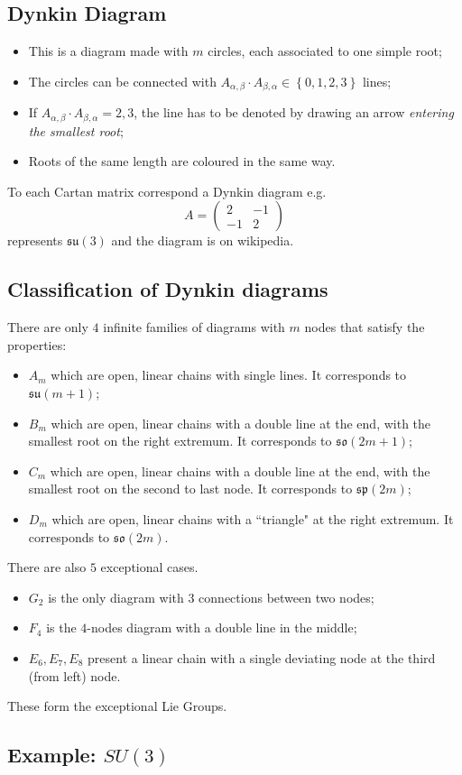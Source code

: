 \subsection{Dynkin Diagram}
\begin{itemize}
    \item This is a diagram made with $m$ circles, each associated to one simple
        root;
    \item The circles can be connected with $A_{\alpha,\beta}\cdot
        A_{\beta,\alpha}\in\left\{0,1,2,3\right\}$ lines;
    \item If $A_{\alpha,\beta}\cdot A_{\beta,\alpha}=2,3$, the line
        has to be denoted by drawing an arrow \textit{entering the smallest root};
    \item Roots of the same length are coloured in the same way.
\end{itemize}
To each Cartan matrix correspond a Dynkin diagram e.g.
\[
    A=\begin{pmatrix}
        2&-1\\
        -1&2
    \end{pmatrix} 
\]
represents $\mathfrak{su}(3)$ and the diagram is on wikipedia.
\subsection{Classification of Dynkin diagrams}
There are only $4$ infinite families of diagrams with $m$ nodes that satisfy the
properties:
\begin{itemize}
    \item $A_m$ which are open, linear chains with single lines.
        It corresponds to $\mathfrak{su}(m+1)$;
    \item $B_m$ which are open, linear chains with a double line at
        the end, with the smallest root on the right extremum. It corresponds to
        $\mathfrak{so}(2m+1)$;
    \item $C_m$ which are open, linear chains with a double line at
        the end, with the smallest root on the second to last node.
        It corresponds to $\mathfrak{sp}(2m)$;
    \item $D_m$ which are open, linear chains with a ``triangle" at the right
        extremum. It corresponds to $\mathfrak{so}(2m)$.
\end{itemize}
There are also $5$ exceptional cases.
\begin{itemize}
    \item $G_2$ is the only diagram with $3$ connections between two nodes;
    \item $F_4$ is the $4$-nodes diagram with a double line in the middle;
    \item $E_6,E_7,E_8$ present a linear chain with a single deviating node
        at the third (from left) node.
\end{itemize}
These form the exceptional Lie Groups.

\subsection{Example: $SU(3)$}

